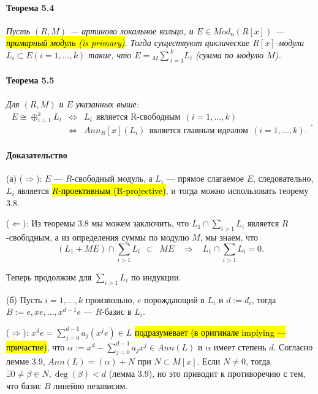 \documentclass[a4paper,12pt]{article}
\newcommand{\dirsummod}[1]{{_{{#1}}\!\!\sum}}
\begin{document}
\paragraph{Теорема 5.4}
{\itshape
Пусть $(R, M)$ --- артиново локальное кольцо, и $E \in Mod_n(R[x])$ --- \hl{примарный модуль (is primary)}. Тогда существуют циклические $R[x]$-модули $L_i \subset E (i = 1, ..., k)$ такие, что $E = \dirsummod{M}_{i = 1}^k L_i$ (сумма по модулю $M$).
}


\paragraph{Теорема 5.5}
{\itshape
Для $(R, M)$ и $E$ указанных выше:
$$
\begin{array}{ccc}
E \cong \oplus_{i = 1}^{k} L_i &  \Leftrightarrow & L_i ~~ \text{является R-свободным} ~~ (i = 1, ..., k) \\

~ &  \Leftrightarrow  &  Ann_R[x](L_i) ~~ \text{является главным идеалом} ~~ (i = 1, ..., k).
\end{array}.
$$
}

\paragraph{Доказательство}
(а) ($\Rightarrow$): $E$ --- $R$-свободный модуль, а $L_i$  --- прямое слагаемое $E$, следовательно, $L_i$ является \hl{$R$-проективным (R-projective)}, и тогда можно использовать теорему 3.8.

($\Leftarrow$): Из теоремы 3.8 мы можем заключить, что $L_1 \cap \sum_{i>1} L_i$ является $R$-свободным, а из определения суммы по модулю $M$, мы знаем, что
$$
(L_1 + M E) \cap \sum_{i>1} L_i ~~ \subset ~~ ME ~~~~ \Rightarrow ~~~~ L_1 \cap \sum_{i>1} L_i = 0.
$$

Теперь продолжим для $\sum_{i>1} L_i$ по индукции.

(б) Пусть $i = 1, ..., k$ произвольно, $e$ порождающий в $L_i$ и $d:=d_i$, тогда $B:={e, xe, ..., x^{d-1}e}$ --- $R$-базис в $L_i$.

($\Rightarrow$): $x^d e = \sum_{j = 0}^{d - 1} a_j (x^j e) \in L$ \hl{подразумевает (в оригинале implying --- причастие)}, что $\alpha := x^d - \sum_{j=0}^{d-1} a_j x^j \in Ann(L)$ и $\alpha$ имеет степень $d$. Согласно лемме 3.9, $Ann(L) = (\alpha) + N$ при $N \subset M[x]$. Если $N \ne 0$, тогда $\exists 0 \ne \beta \in N, \deg(\beta) < d$ (лемма 3.9), но это приводит к противоречию с тем, что базис $B$ линейно независим.
\end{document}
